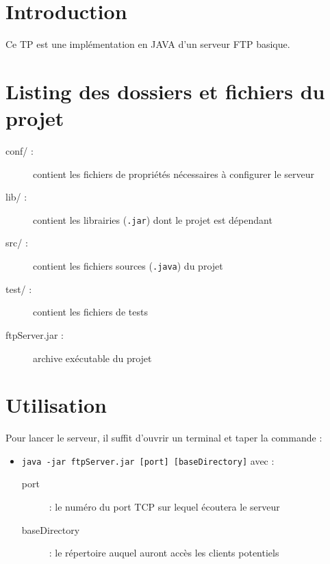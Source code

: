 \section*{Introduction}
Ce TP est une implémentation en JAVA d'un serveur FTP basique.

\section*{Listing des dossiers et fichiers du projet}
\begin{description}
	\item[conf/ :] contient les fichiers de propriétés nécessaires à configurer le serveur
	\item[lib/ :] contient les librairies (\verb+.jar+) dont le projet est dépendant
	\item[src/ :] contient les fichiers sources (\verb+.java+) du projet
	\item[test/ :] contient les fichiers de tests
	\item[ftpServer.jar :] archive exécutable du projet
\end{description}

\section*{Utilisation}
Pour lancer le serveur, il suffit d'ouvrir un terminal et taper la commande :
\begin{itemize}
	\item \verb+java -jar ftpServer.jar [port] [baseDirectory]+ avec :
		\begin{description}
			\item[port] : le numéro du port TCP sur lequel écoutera le serveur
			\item[baseDirectory] : le répertoire auquel auront accès les clients potentiels
		\end{description}
\end{itemize}

